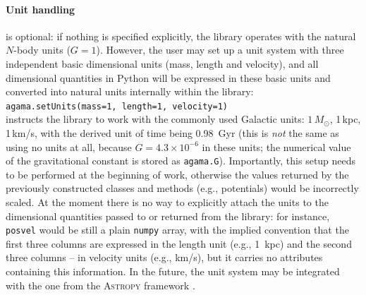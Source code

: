 \documentclass[12pt]{article}
\begin{document}
\paragraph{Unit handling} is optional: if nothing is specified explicitly, the library operates with the natural $N$-body units ($G=1$). However, the user may set up a unit system with three independent basic dimensional units (mass, length and velocity), and all dimensional quantities in Python will be expressed in these basic units and converted into natural units internally within the library:\\[1mm]
\texttt{agama.setUnits(mass=1, length=1, velocity=1)}\\[1mm]
instructs the library to work with the commonly used Galactic units: $1\,M_\odot$, 1\,kpc, 1\,km/s, with the derived unit of time being 0.98~Gyr (this is \textit{not} the same as using no units at all, because $G=4.3\times10^{-6}$ in these units; the numerical value of the gravitational constant is stored as \texttt{agama.G}). Importantly, this setup needs to be performed at the beginning of work, otherwise the values returned by the previously constructed classes and methods (e.g., potentials) would be incorrectly scaled.
At the moment there is no way to explicitly attach the units to the dimensional quantities passed to or returned from the library: for instance, \texttt{posvel} would be still a plain \texttt{numpy} array, with the implied convention that the first three columns are expressed in the length unit (e.g., 1~kpc) and the second three columns -- in velocity units (e.g., km/s), but it carries no attributes containing this information. In the future, the unit system may be integrated with the one from the \textsc{Astropy} framework \cite{Astropy}.
\end{document}

